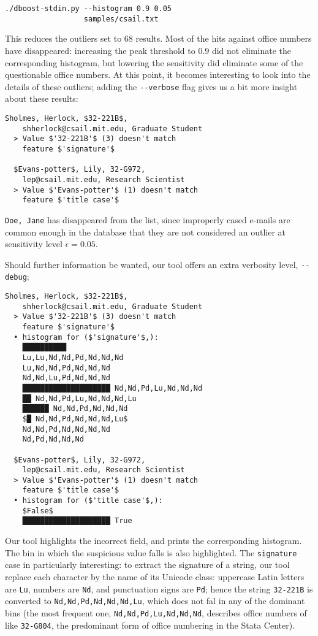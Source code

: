 \begin{lstlisting}[gobble=2]
./dboost-stdin.py --histogram 0.9 0.05 
                  samples/csail.txt
\end{lstlisting}

This reduces the outliers set to $68$ results. Most of the hits against office numbers have disappeared: increasing the peak threshold to $0.9$ did not eliminate the corresponding histogram, but lowering the sensitivity did eliminate some of the questionable office numbers. At this point, it becomes interesting to look into the details of these outliers; adding the \lstinline{--verbose} flag gives us a bit more insight about these results:

\begin{lstlisting}[gobble=2]
  Sholmes, Herlock, $32-221B$, 
    shherlock@csail.mit.edu, Graduate Student
  > Value $'32-221B'$ (3) doesn't match 
    feature $'signature'$
 
  $Evans-potter$, Lily, 32-G972, 
    lep@csail.mit.edu, Research Scientist
  > Value $'Evans-potter'$ (1) doesn't match 
    feature $'title case'$  
\end{lstlisting}

\lstinline{Doe, Jane} has disappeared from the list, since improperly cased e-mails are common enough in the database that they are not considered an outlier at sensitivity level $\epsilon = 0.05$.
 
Should further information be wanted, our tool offers an extra verbosity level, \lstinline{--debug};

\begin{lstlisting}[gobble=2]
  Sholmes, Herlock, $32-221B$, 
    shherlock@csail.mit.edu, Graduate Student
  > Value $'32-221B'$ (3) doesn't match 
    feature $'signature'$
  • histogram for ($'signature'$,):
    ██████████ 
    Lu,Lu,Nd,Nd,Pd,Nd,Nd,Nd
    Lu,Nd,Nd,Pd,Nd,Nd,Nd
    Nd,Nd,Lu,Pd,Nd,Nd,Nd
    ████████████████████ Nd,Nd,Pd,Lu,Nd,Nd,Nd
    ██ Nd,Nd,Pd,Lu,Nd,Nd,Nd,Lu
    ██████ Nd,Nd,Pd,Nd,Nd,Nd
    $█ Nd,Nd,Pd,Nd,Nd,Nd,Lu$
    Nd,Nd,Pd,Nd,Nd,Nd,Nd
    Nd,Pd,Nd,Nd,Nd

  $Evans-potter$, Lily, 32-G972, 
    lep@csail.mit.edu, Research Scientist
  > Value $'Evans-potter'$ (1) doesn't match 
    feature $'title case'$  
  • histogram for ($'title case'$,):
    $False$
    ████████████████████ True
\end{lstlisting}

Our tool highlights the incorrect field, and prints the corresponding histogram. The bin in which the suspicious value falls is also highlighted. The \lstinline{signature} case in particularly interesting: to extract the signature of a string, our tool replace each character by the name of its Unicode class: uppercase Latin letters are \lstinline{Lu}, numbers are \lstinline{Nd}, and punctuation signs are \lstinline{Pd}; hence the string \lstinline{32-221B} is converted to \lstinline{Nd,Nd,Pd,Nd,Nd,Nd,Lu}, which does not fal in any of the dominant bins (the most frequent one, \lstinline{Nd,Nd,Pd,Lu,Nd,Nd,Nd}, describes office numbers of like \lstinline{32-G804}, the predominant form of office numbering in the Stata Center).

